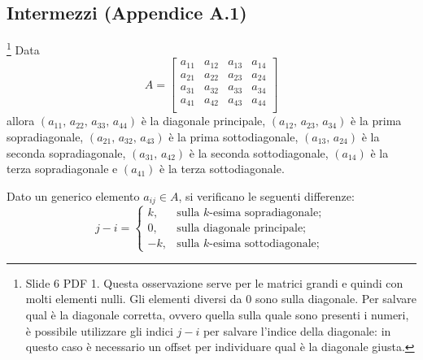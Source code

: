 \subsection{Intermezzi (Appendice A.1)}
\begin{remark}\label{re:diagonali}\footnote{Slide 6 PDF 1. Questa osservazione serve per le matrici grandi e quindi con molti elementi nulli. Gli elementi diversi da 0 sono sulla diagonale. Per salvare qual è la diagonale corretta, ovvero quella sulla quale sono presenti i numeri, è possibile utilizzare gli indici $j-i$ per salvare l'indice della diagonale: in questo caso è necessario un offset per individuare qual è la diagonale giusta.}
	Data
    \begin{equation}
        A=\begin{bmatrix}
            a_{11} & a_{12} & a_{13} & a_{14}\\
            a_{21} & a_{22} & a_{23} & a_{24}\\
            a_{31} & a_{32} & a_{33} & a_{34}\\
            a_{41} & a_{42} & a_{43} & a_{44}\\
        \end{bmatrix}
    \end{equation}
    allora $(a_{11},\, a_{22},\, a_{33},\, a_{44})$ è la diagonale principale, $(a_{12},\, a_{23},\, a_{34})$ è la prima sopradiagonale, $(a_{21},\, a_{32},\, a_{43})$ è la prima sottodiagonale, $(a_{13},\, a_{24})$ è la seconda sopradiagonale,  $(a_{31},\, a_{42})$ è la seconda sottodiagonale, $(a_{14})$ è la terza sopradiagonale e $(a_{41})$ è la terza sottodiagonale. 
\end{remark}

\begin{example}
    Dato un generico elemento $a_{ij}\in A$, si verificano le seguenti differenze: 
    \begin{equation*}
        j-i=\begin{cases}
        k, &\text{sulla $k$-esima sopradiagonale};\\
        0, &\text{sulla diagonale principale};\\
        -k, &\text{sulla $k$-esima sottodiagonale};
    \end{cases}
    \end{equation*}
\end{example}

